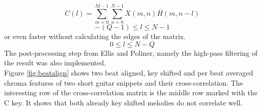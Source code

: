 \begin{equation} \label{eq:conv5}
C(l) = \sum_{m = 0}^{M - 1}{\sum_{n = 0}^{N - 1}{X(m, n)\overline{H}(m, n - l)}}
\end{equation}
\begin{equation} \label{eq:conv6}
-(Q - 1) \leq l \leq N - 1
\end{equation}
or even faster without calculating the edges of the matrix.
\begin{equation} \label{eq:conv7}
0 \leq l \leq N - Q
\end{equation}
The post-processing step from Ellis and Poliner, namely the high-pass filtering of the result was also implemented.\\
Figure \ref{fig:beatalign} shows two beat aligned, key shifted and per beat averaged chroma features of two short guitar snippets and their cross-correlation. The interesting row of the cross-correlation matrix is the middle row marked with the C key. It shows that both already key shifted melodies do not correlate well.  
